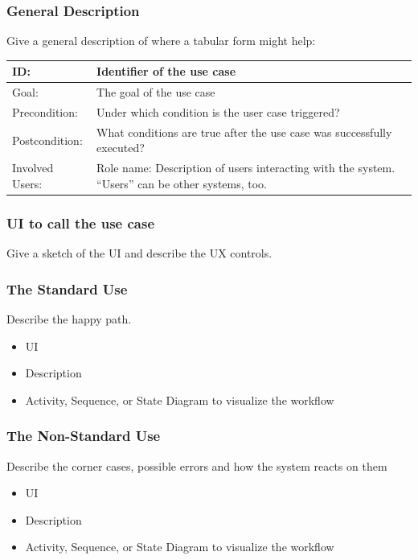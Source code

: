 \documentclass[12pt]{article}
\theoremstyle{definition}
\newenvironment{explanation}{%
   \setlength{\parindent}{0pt}
   \itshape
   \color{blue}
}{}
\begin{document}
\subsubsection{General Description}
\begin{explanation}
Give a general description of where a tabular form might help:
\end{explanation}

\begin{tabular}{|p{.2\linewidth}|p{.65\linewidth}|}
\hline 
ID: & Identifier of the use case \\ \hline
Goal: & The goal of the use case \\ \hline
Precondition: & Under which condition is the user case triggered? \\ \hline
Postcondition: & What conditions are true after the use case was successfully executed? \\ \hline
Involved Users: &Role name: Description of users interacting with the system. “Users” can be other systems, too. \\ \hline
\end{tabular}

\subsubsection{UI to call the use case}
\begin{explanation}
Give a sketch of the UI and describe the UX controls.
\end{explanation}

\subsubsection{The Standard Use}
\begin{explanation}
Describe the happy path.
\begin{itemize}
	\item UI
	\item Description
	\item Activity, Sequence, or State Diagram to visualize the workflow
\end{itemize}
\end{explanation}

\subsubsection{The Non-Standard Use}
\begin{explanation}
Describe the corner cases, possible errors and how the system reacts on them
\begin{itemize}
	\item UI
	\item Description
	\item Activity, Sequence, or State Diagram to visualize the workflow
\end{itemize}
\end{explanation}
\pagebreak
\end{document}
